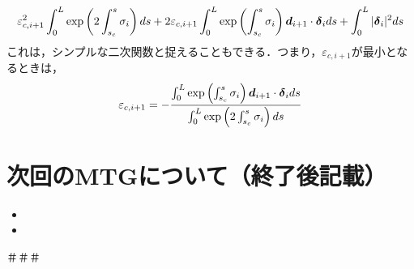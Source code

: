 \documentclass[16pt]{jsarticle}
\begin{document}
		\begin{equation}\label{eq:FirstAmendEqVer2}
			\varepsilon_{c,i+1}^2 \int_{0}^{L} \exp \left(2 \int_{s_c}^s \sigma_i \right) ds + 2 \varepsilon_{c,i+1} \int_{0}^{L} \exp \left( \int_{s_c}^s \sigma_i \right) \boldsymbol{d}_{i+1} \cdot \boldsymbol{\delta}_i ds + \int_{0}^{L} |\boldsymbol{\delta}_i|^2 ds 
		\end{equation}
		これは，シンプルな二次関数と捉えることもできる．つまり，$ \varepsilon_{c,i+1} $が最小となるときは，
		\begin{equation}\label{eq:eps_i+1eq}
			\varepsilon_{c,i+1} = - \frac{\int_{0}^{L} \exp \left( \int_{s_c}^s \sigma_i \right) \boldsymbol{d}_{i+1} \cdot \boldsymbol{\delta}_i ds}{\int_{0}^{L} \exp \left(2 \int_{s_c}^s \sigma_i \right) ds}
		\end{equation}
		
		
		
	\section{次回のMTGについて（終了後記載）}
	\begin{itemize}
		\item  
		\item 
	\end{itemize}
	＃＃＃
	\newpage
	

\end{document}

